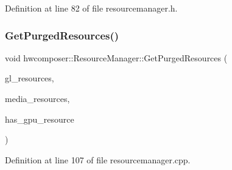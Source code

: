 Definition at line 82 of file resourcemanager.\+h.


\begin{DoxyCode}{0}
\end{DoxyCode}
\mbox{\label{classhwcomposer_1_1ResourceManager_afda313d41d4a7d91f2c8e7fe99779f11}} 
\subsubsection{\texorpdfstring{Get\+Purged\+Resources()}{GetPurgedResources()}}
{\footnotesize\ttfamily void hwcomposer\+::\+Resource\+Manager\+::\+Get\+Purged\+Resources (\begin{DoxyParamCaption}\item[{std\+::vector$<$ \mbox{\hyperlink{namespacehwcomposer_a963c5a1d5902d2d05710dba19af35b48}{Resource\+Handle}} $>$ \&}]{gl\+\_\+resources,  }\item[{std\+::vector$<$ \mbox{\hyperlink{namespacehwcomposer_aa99e35835961ac7d6baa59a04131ff42}{Media\+Resource\+Handle}} $>$ \&}]{media\+\_\+resources,  }\item[{bool $\ast$}]{has\+\_\+gpu\+\_\+resource }\end{DoxyParamCaption})}



Definition at line 107 of file resourcemanager.\+cpp.


